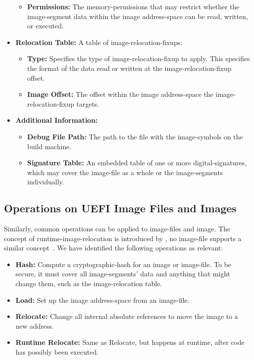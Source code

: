 \begin{itemize}
\begin{itemize}
    \item \textbf{Permissions:} The \gls{memory-permissions} that may restrict whether the \gls{image-segment} data within the \gls{image} \gls{address-space} can be read, written, or executed.
  \end{itemize}
  \item \textbf{Relocation Table:} A table of \glspl{image-relocation-fixup}:\mynobreakpar
  \begin{itemize}
    \item \textbf{Type:} Specifies the type of \gls{image-relocation-fixup} to apply. This specifies the format of the data read or written at the \gls{image-relocation-fixup} offset.
    \item \textbf{Image Offset:} The offset within the \gls{image} \gls{address-space} the \gls{image-relocation-fixup} targets.
  \end{itemize}
  \item \textbf{Additional Information:}\mynobreakpar
  \begin{itemize}
    \item \textbf{Debug File Path:} The path to the file with the \glspl{image-symbol} on the build machine.
    \item \textbf{Signature Table:} An embedded table of one or more \glspl{digital-signature}, which may cover the \gls{image-file} as a whole or the \glspl{image-segment} individually.
  \end{itemize}
\end{itemize}

\subsection{Operations on UEFI Image Files and Images}

Similarly, common operations can be applied to \glspl{image-file} and \gls{image}. The concept of \gls{runtime-image-relocation} is introduced by , no \gls{image-file} supports a similar concept~\cite{uefi-spec,elf-spec,macho-spec,pe-format}. We have identified the following operations as relevant:
\begin{itemize}
  \item \textbf{Hash:} Compute a \gls{cryptographic-hash} for an \gls{image} or \gls{image-file}. To be secure, it must cover all \glspl{image-segment}' data and anything that might change them, such as the \gls{image-relocation} table.
  \item \textbf{Load:} Set up the \gls{image} \gls{address-space} from an \gls{image-file}.
  \item \textbf{Relocate:} Change all internal absolute references to move the \gls{image} to a new address.
  \item \textbf{Runtime Relocate:} Same as Relocate, but happens at runtime, after code has possibly been executed.
\end{itemize}

